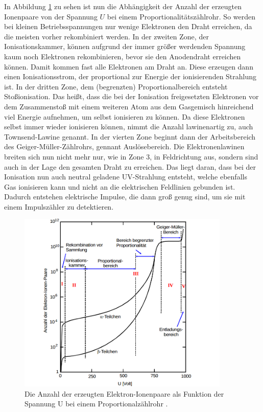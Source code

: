 \documentclass[
  bibliography=totoc,     %
  captions=tableheading,  %
  titlepage=firstiscover, %
]{scrartcl}
\begin{document}
\noindent
In Abbildung \ref{fig:V7032} zu sehen ist nun die Abhängigkeit der Anzahl der
erzeugten Ionenpaare von der Spannung $U$ bei einem Proportionalitätszählrohr.
So werden bei kleinen Betriebsspannungen nur wenige Elektronen den Draht
erreichen, da die meisten vorher rekombiniert werden. In der zweiten Zone, der
Ionisationskammer, können aufgrund der immer größer werdenden Spannung kaum noch
Elektronen rekombinieren, bevor sie den Anodendraht erreichen können. Damit
kommen fast alle Elektronen am Draht an. Diese erzeugen dann einen
Ionisationsstrom, der proportional zur Energie der ionisierenden Strahlung ist.
In der dritten Zone, dem (begrenzten) Proportionalbereich entsteht Stoßionisation.
Das heißt, dass die bei der Ionisation freigesetzten Elektronen vor dem Zusammenstoß
mit einem weiteren Atom aus dem Gasgemisch hinreichend viel Energie aufnehmen, um
selbst ionisieren zu können. Da diese Elektronen selbst immer wieder ionisieren
können, nimmt die Anzahl lawinenartig zu, auch Townsend-Lawine genannt.
In der vierten Zone beginnt dann der Arbeitsbereich des Geiger-Müller-Zählrohrs,
gennant Auslösebereich. Die Elektronenlawinen breiten sich nun nicht mehr nur,
wie in Zone 3, in Feldrichtung aus, sondern sind auch in der Lage den gesamten Draht
zu erreichen. Das liegt daran, dass bei der Ionisation nun auch neutral geladene
UV-Strahlung entsteht, welche ebenfalls Gas ionisieren kann und nicht an die elektrischen
Feldlinien gebunden ist. Dadurch entstehen elektrische Impulse, die dann groß genug
sind, um sie mit einem Impulszähler zu detektieren.
\begin{figure}[htb]
  \centering
  \includegraphics[width=0.9\textwidth]{V7032.png}
  \caption{Die Anzahl der erzeugten Elektron-Ionenpaare als Funktion der
  Spannung U bei einem Proportionalzählrohr \cite{anleitung}.}
  \label{fig:V7032}
\end{figure}
\end{document}
